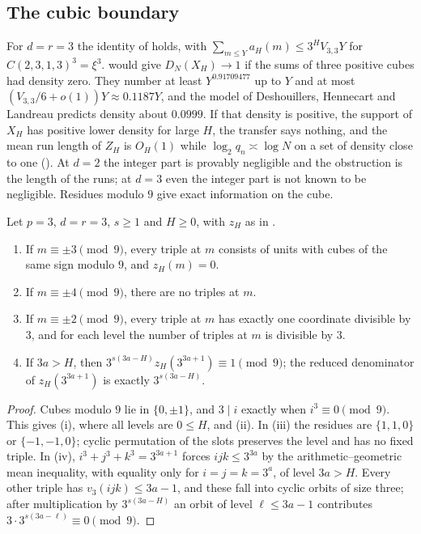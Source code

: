 \documentclass[11pt]{article}
\begin{document}
\subsection{The cubic boundary}

For $d=r=3$ the identity of  holds, with $\sum_{m\le Y}a_H(m)\le3^HV_{3,3}Y$ for
$C(2,3,1,3)^3=\xi^3$.  would give $D_N(X_H)\to1$ if the sums of three positive cubes had
density zero. They number at least $Y^{0.91709477}$ up to $Y$ \cite{Wooley15} and at most $(V_{3,3}/6+o(1))Y\approx
0.1187Y$, and the model of Deshouillers, Hennecart and Landreau \cite{DHL06} predicts density about $0.0999$. If
that density is positive, the support of $X_H$ has positive lower density for large $H$, the transfer says
nothing, and the mean run length of $Z_H$ is $O_H(1)$ while $\log_2q_n\asymp\log N$ on a set of density close to
one (). At $d=2$ the integer part is provably negligible and the obstruction is the
length of the runs; at $d=3$ even the integer part is not known to be negligible. Residues modulo $9$ give exact
information on the cube.

\begin{proposition}\label{prop:cubic9}
Let $p=3$, $d=r=3$, $s\ge1$ and $H\ge0$, with $z_H$ as in .
\begin{enumerate}[label=\textup{(\roman*)},nosep]
\item If $m\equiv\pm3\pmod9$, every triple at $m$ consists of units with cubes of the same sign modulo $9$, and $z_H(m)=0$.
\item If $m\equiv\pm4\pmod9$, there are no triples at $m$.
\item If $m\equiv\pm2\pmod9$, every triple at $m$ has exactly one coordinate divisible by $3$, and for each level the
number of triples at $m$ is divisible by $3$.
\item If $3a>H$, then $3^{s(3a-H)}z_H(3^{3a+1})\equiv1\pmod9$; the reduced denominator of $z_H(3^{3a+1})$ is exactly
$3^{s(3a-H)}$.
\end{enumerate}
\end{proposition}

\begin{proof}
Cubes modulo $9$ lie in $\{0,\pm1\}$, and $3\mid i$ exactly when $i^3\equiv0\pmod9$. This gives (i), where all levels are
$0\le H$, and (ii). In (iii) the residues are $\{1,1,0\}$ or $\{-1,-1,0\}$; cyclic permutation of the slots preserves
the level and has no fixed triple. In (iv), $i^3+j^3+k^3=3^{3a+1}$ forces $ijk\le3^{3a}$ by the arithmetic--geometric
mean inequality, with equality only for $i=j=k=3^a$, of level $3a>H$. Every other triple has $v_3(ijk)\le3a-1$, and
these fall into cyclic orbits of size three; after multiplication by $3^{s(3a-H)}$ an orbit of level $\ell\le3a-1$
contributes $3\cdot3^{s(3a-\ell)}\equiv0\pmod9$.
\end{proof}
\end{document}
